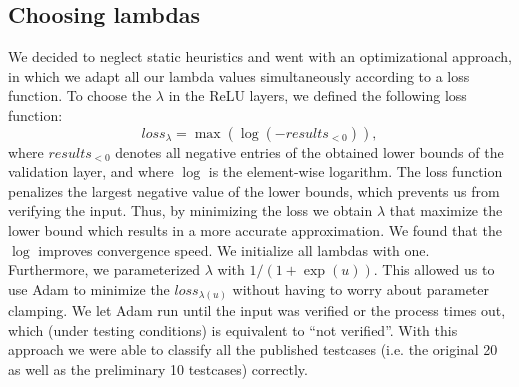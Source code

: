 \documentclass[10pt,a4paper]{article}
\begin{document}
\subsection*{Choosing lambdas}
We decided to neglect static heuristics and went with an optimizational approach, in which we adapt all our lambda values simultaneously according to a loss function.
To choose the $\lambda$ in the ReLU layers, we defined the following loss function:\\
$$loss_\lambda = \max(\log(-results_{<0})),$$
where $results_{<0}$ denotes all negative entries of the obtained lower bounds of the validation layer, and where $\log$ is the element-wise logarithm. The loss function penalizes the largest negative value of the lower bounds, which prevents us from verifying the input. Thus, by minimizing the loss we obtain $\lambda$ that maximize the lower bound which results in a more accurate approximation. We found that the $\log$ improves convergence speed. We initialize all lambdas with one.\\
Furthermore, we parameterized $\lambda$ with $1/(1+\exp(u))$. This allowed us to use Adam to minimize the $loss_{\lambda(u)}$ without having to worry about parameter clamping. We let Adam run until the input was verified or the process times out, which (under testing conditions) is equivalent to ``not verified''. With this approach we were able to classify all the published testcases (i.e. the original 20 as well as the preliminary 10 testcases) correctly.
\end{document}

